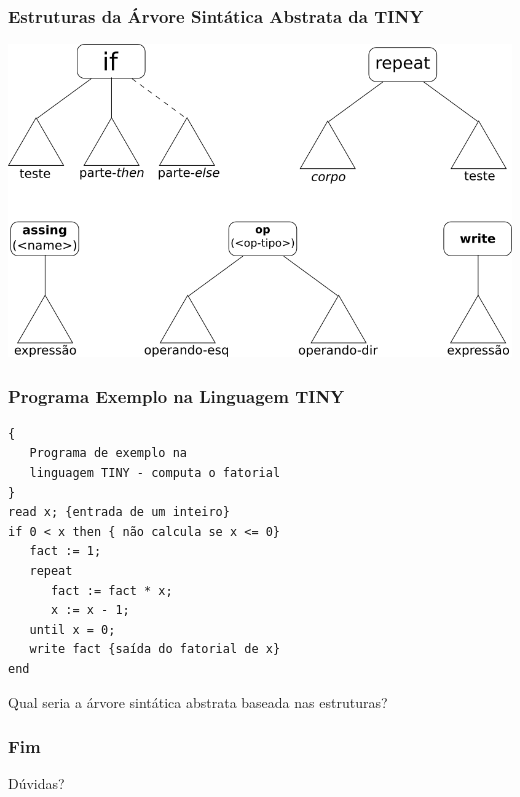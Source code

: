 \documentclass[table]{beamer}
\begin{document}
\begin{frame}[fragile]
   \frametitle{Estruturas da Árvore Sintática Abstrata da TINY}
   \includegraphics[width=\linewidth,height=\textheight,keepaspectratio]{figuras/diagrama_tiny.png}
\end{frame}

\begin{frame}[fragile]
   \frametitle{Programa Exemplo na Linguagem TINY}
   \begin{verbatim}
{
   Programa de exemplo na 
   linguagem TINY - computa o fatorial
}
read x; {entrada de um inteiro}
if 0 < x then { não calcula se x <= 0}
   fact := 1;
   repeat
      fact := fact * x;
      x := x - 1;
   until x = 0;
   write fact {saída do fatorial de x}
end
   \end{verbatim}
   Qual seria a árvore sintática abstrata baseada nas estruturas?
\end{frame}

\begin{frame}
   \frametitle{Fim}
   Dúvidas?
\end{frame}
\end{document}
